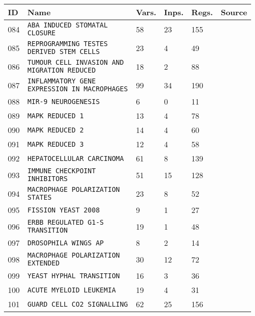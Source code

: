 \documentclass{article}
\begin{document}
\begin{center}
	\begin{tabular}{ | C{16pt} | C{149pt} | C{25pt} | C{25pt} | C{25pt} | C{36pt} | }
		\hline
		ID & Name & Vars. & Inps. & Regs. & Source \\ 
		 & \texttt{ABA INDUCED STOMATAL CLOSURE} & 58 & 23 & 155 & \cite{bbm-084} \\
		 & \texttt{REPROGRAMMING TESTES DERIVED STEM CELLS} & 23 & 4 & 49 & \cite{bbm-085} \\
		 & \texttt{TUMOUR CELL INVASION AND MIGRATION REDUCED} & 18 & 2 & 88 & \cite{bbm-065-086, ginsim} \\
		 & \texttt{INFLAMMATORY GENE EXPRESSION IN MACROPHAGES} & 99 & 34 & 190 & \cite{bbm-087} \\
		 & \texttt{MIR-9 NEUROGENESIS} & 6 & 0 & 11 & \cite{bbm-088, ginsim} \\
		 & \texttt{MAPK REDUCED 1} & 13 & 4 & 78 & \cite{bbm-070-089-090-091, ginsim} \\
		 & \texttt{MAPK REDUCED 2} & 14 & 4 & 60 & \cite{bbm-070-089-090-091, ginsim} \\
		 & \texttt{MAPK REDUCED 3} & 12 & 4 & 58 & \cite{bbm-070-089-090-091, ginsim} \\
		 & \texttt{HEPATOCELLULAR CARCINOMA} & 61 & 8 & 139 & \cite{bbm-092} \\
		 & \texttt{IMMUNE CHECKPOINT INHIBITORS} & 51 & 15 & 128 & \cite{bbm-093, ginsim} \\
		 & \texttt{MACROPHAGE POLARIZATION STATES} & 23 & 8 & 52 & \cite{bbm-094} \\
		 & \texttt{FISSION YEAST 2008} & 9 & 1 & 27 & \cite{bbm-095, ginsim} \\
		 & \texttt{ERBB REGULATED G1-S TRANSITION} & 19 & 1 & 48 & \cite{bbm-096, ginsim} \\
		 & \texttt{DROSOPHILA WINGS AP} & 8 & 2 & 14 & \cite{bbm-097, ginsim} \\
		 & \texttt{MACROPHAGE POLARIZATION EXTENDED} & 30 & 12 & 72 & \cite{bbm-098} \\
		 & \texttt{YEAST HYPHAL TRANSITION} & 16 & 3 & 36 & \cite{bbm-099} \\
		 & \texttt{ACUTE MYELOID LEUKEMIA} & 19 & 4 & 31 & \cite{bbm-100} \\
		 & \texttt{GUARD CELL CO2 SIGNALLING} & 62 & 25 & 156 & \cite{bbm-101} \\

\end{tabular}
\end{center}
\end{document}
